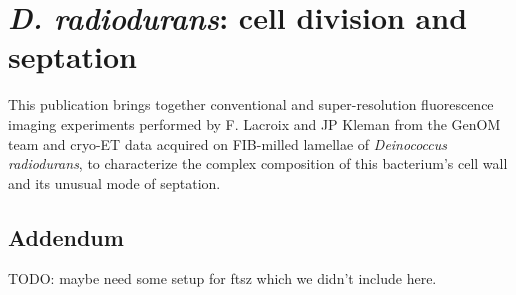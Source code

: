 \chapter{\textit{D. radiodurans}: cell division and septation}\label{drad}

This publication brings together conventional and super-resolution fluorescence imaging experiments performed by F. Lacroix and JP Kleman from the GenOM team and cryo-ET data acquired on FIB-milled lamellae of \textit{Deinococcus radiodurans}, to characterize the complex composition of this bacterium’s cell wall and its unusual mode of septation.

\localtableofcontents
\newpage

\newpage

\section{Addendum}

TODO: maybe need some setup for ftsz which we didn't include here.
